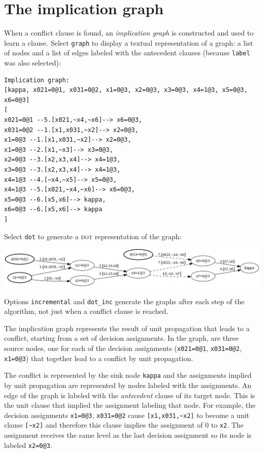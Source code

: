 \documentclass[11pt]{report}
\newcommand*{\p}[1]{\textup{\texttt{#1}}}
\newcommand*{\dt}{\textsc{dot}}
\begin{document}
\clearpage

\section{The implication graph}

When a conflict clause is found, an \emph{implication graph} is
constructed and used to learn a clause. Select \p{graph} to display a
textual representation of a graph: a list of nodes and a list of
edges labeled with the antecedent clauses (because \p{label} was also
selected):

\begin{verbatim}
Implication graph:
[kappa, x021=0@1, x031=0@2, x1=0@3, x2=0@3, x3=0@3, x4=1@3, x5=0@3, x6=0@3]
[
x021=0@1 --5.[x021,~x4,~x6]--> x6=0@3,
x031=0@2 --1.[x1,x031,~x2]--> x2=0@3,
x1=0@3 --1.[x1,x031,~x2]--> x2=0@3,
x1=0@3 --2.[x1,~x3]--> x3=0@3,
x2=0@3 --3.[x2,x3,x4]--> x4=1@3,
x3=0@3 --3.[x2,x3,x4]--> x4=1@3,
x4=1@3 --4.[~x4,~x5]--> x5=0@3,
x4=1@3 --5.[x021,~x4,~x6]--> x6=0@3,
x5=0@3 --6.[x5,x6]--> kappa,
x6=0@3 --6.[x5,x6]--> kappa
]
\end{verbatim}

Select \p{dot} to generate a \dt{} representation of the
graph:

\begin{center}
\includegraphics[keepaspectratio=true,width=\textwidth]{graph-bw}
\end{center}

Options \p{incremental} and \p{dot\_inc} generate the graphs after each
step of the algorithm, not just when a conflict clause is reached.

The implication graph represents the result of unit propagation that
leads to a conflict, starting from a set of decision assignments. In the
graph, are three source nodes, one for each of the decision assignments
(\p{x021=0@1}, \p{x031=0@2}, \p{x1=0@3}) that together lead to a
conflict by unit propagation.

The conflict is represented by the sink node \p{kappa} and the
assignments implied by unit propagation are represented by nodes labeled
with the assignments. An edge of the graph is labeled with the
\emph{antecedent} clause of its target node. This is the unit clause
that implied the assignment labeling that node. For example, the
decision assignments \p{x1=0@3}, \p{x031=0@2} cause \verb+[x1,x031,~x2]+
to become a unit clause \verb+[~x2]+ and therefore this clause implies
the assignment of 0 to \p{x2}. The assignment receives the same level as
the last decision assignment so its node is labeled \p{x2=0@3}.
\end{document}
